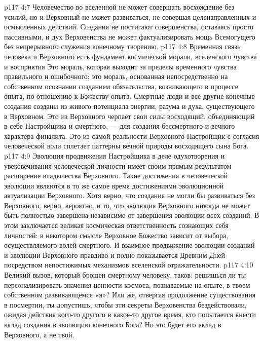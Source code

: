 \vs p117 4:7 \pc Человечество во вселенной не может совершать восхождение без усилий, но и Верховный не может развиваться, не совершая целенаправленных и осмысленных действий. Создания не постигают совершенства, оставаясь просто пассивными, и дух Верховенства не может фактуализировать мощь Всемогущего без непрерывного служения конечному творению.
\vs p117 4:8 Временная связь человека и Верховного есть фундамент космической морали, вселенского чувства и восприятия  Это мораль, которая выходит за пределы временного чувства правильного и ошибочного; это мораль, основанная непосредственно на собственном осознании созданием обязательства, возникающего в процессе опыта, по отношению к Божеству опыта. Смертные люди и все другие конечные создания созданы из живого потенциала энергии, разума и духа, существующего в Верховном. Это из Верховного черпает свои силы восходящий, объединяющий в себе Настройщика и смертного, --- для создания бессмертного и вечного характера финалита. Это из самой реальности Верховного Настройщик с согласия человеческой воли сплетает паттерны вечной природы восходящего сына Бога.
\vs p117 4:9 Эволюция продвижения Настройщика в деле одухотворения и увековечивания человеческой личности имеет своим прямым результатом расширение владычества Верховного. Такие достижения в человеческой эволюции являются в то же самое время достижениями эволюционной актуализации Верховного. Хотя верно, что создания не могли бы развиваться без Верховного, верно, вероятно, и то, что эволюция Верховного никогда не может быть полностью завершена независимо от завершения эволюции всех созданий. В этом заключается великая космическая ответственность сознающих себя личностей: в некотором смысле Верховное Божество зависит от выбора, осуществляемого волей смертного. И взаимное продвижение эволюции созданий и эволюции Верховного правдиво и полно показывается Древним Дней посредством непостижимых механизмов вселенской отражательности.
\vs p117 4:10 Великий вызов, который брошен смертному человеку, таков: решишься ли ты персонализировать значения\hyp{}ценности космоса, познаваемые на опыте, в твоем собственном развивающемся «я»? Или же, отвергая продолжение существования в посмертии, ты допустишь, чтобы эти секреты Верховенства бездействовали, ожидая действия кого\hyp{}то другого в какое\hyp{}то другое время, кто попытается  внести вклад создания в эволюцию конечного Бога? Но это будет его вклад в Верховного, а не твой.
